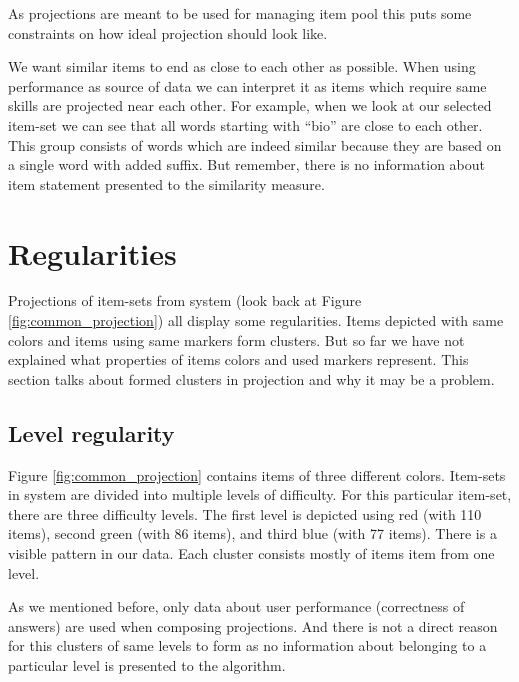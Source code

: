 \documentclass[
  digital, %
  table,   %
  nolof,     %
  nolot,     %
  nocover,
  color,
  final, %
]{fithesis3}
\begin{document}

As projections are meant to be used for managing item pool this puts some constraints on how ideal projection should look like.

We want similar items to end as close to each other as possible. When using performance as source of data we can interpret it as items which require same skills are projected near each other. For example, when we look at our selected item-set we can see that all words starting with ``bio'' are close to each other. This group consists of words which are indeed similar because they are based on a single word with added suffix. But remember, there is no information about item statement presented to the similarity measure.


\section{Regularities}\label{regularities}


Projections of item-sets from system \umimeCesky{} (look back at Figure \ref{fig:common_projection}) all display some regularities. Items depicted with same colors and items using same markers form clusters. But so far we have not explained what properties of items colors and used markers represent. This section talks about formed clusters in projection and why it may be a problem.


\subsection{Level regularity}\label{regularities-level-regularity}


Figure \ref{fig:common_projection} contains items of three different colors. Item-sets in system \umimeCesky{} are divided into multiple levels of difficulty. For this particular item-set, there are three difficulty levels. The first level is depicted using red (with 110 items), second green (with 86 items), and third blue (with 77 items). There is a  visible pattern in our data. Each cluster consists mostly of items item from one level.

As we mentioned before, only data about user performance (correctness of answers) are used when composing projections. And there is not a direct reason for this clusters of same levels to form as no information about belonging to a particular level is presented to the algorithm.
\end{document}
